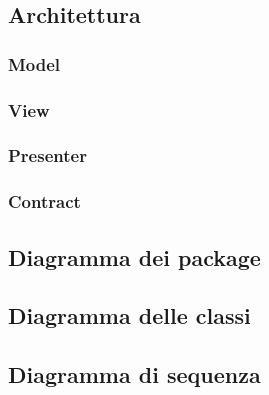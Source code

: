 \subsection{Architettura}



\subsubsection{Model}

\subsubsection{View}

\subsubsection{Presenter}

\subsubsection{Contract}


\subsection{Diagramma dei package}

\subsection{Diagramma delle classi}

\subsection{Diagramma di sequenza}
